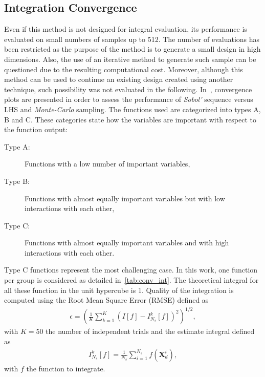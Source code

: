 \subsection{Integration Convergence}

Even if this method is not designed for integral evaluation, its performance is evaluated on small numbers of samples up to 512. The number of evaluations has been restricted as the purpose of the method is to generate a small design in high dimensions. Also, the use of an iterative method to generate such sample can be questioned due to the resulting computational cost. Moreover, although this method can be used to continue an existing design created using another technique, such possibility was not evaluated in the following. In~\citep{Kucherenko2015}, convergence plots are presented in order to assess the performance of \emph{Sobol'} sequence versus LHS and \emph{Monte-Carlo} sampling. The functions used are categorized into types A, B and C. These categories state how the variables are important with respect to the function output:
\begin{description}
\item[Type A:] Functions with a low number of important variables,
\item[Type B:] Functions with almost equally important variables but with low interactions with each other,
\item[Type C:] Functions with almost equally important variables and with high interactions with each other.
\end{description}
Type C functions represent the most challenging case. In this work, one function per group is considered as detailed in~\cref{tab:conv_int}. The theoretical integral for all these function in the unit hypercube is 1. Quality of the integration is computed using the Root Mean Square Error (RMSE) defined as
\begin{align}
\epsilon = \left( \frac{1}{K} \displaystyle \sum_{k=1}^{K} \left(I[f] - I_{N_s}^k [f]\right)^2 \right)^{1/2},
\end{align}
\noindent with $K=50$ the number of independent trials and the estimate integral defined as
\begin{align}
I_{N_s}^k [f] = \frac{1}{N_s} \sum_{i=1}^{N_s} f(\mathbf{X}^{i}_d),
\end{align}
\noindent with $f$ the function to integrate. %

